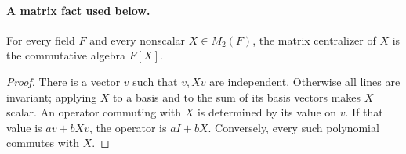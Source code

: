 \paragraph{A matrix fact used below.}
\begin{lemma}\label{lem:matrix-centralizer}
For every field $F$ and every nonscalar $X\in M_2(F)$, the matrix
centralizer of $X$ is the commutative algebra $F[X]$.
\end{lemma}
\begin{proof}
There is a vector $v$ such that $v,Xv$ are independent. Otherwise
all lines are invariant; applying $X$ to a basis and to the sum of
its basis vectors makes $X$ scalar. An operator commuting with $X$
is determined by its value on $v$. If that value is $av+bXv$, the
operator is $aI+bX$. Conversely, every such polynomial commutes with $X$.
\end{proof}

